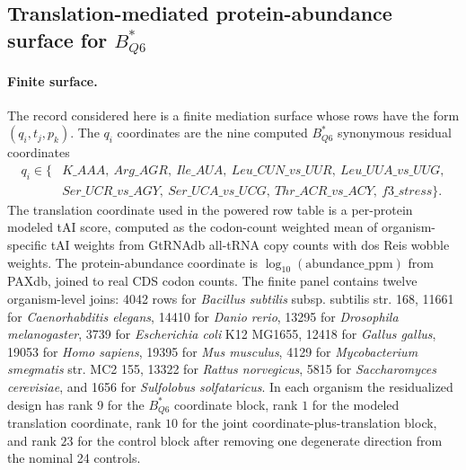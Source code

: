 \subsection{Translation-mediated protein-abundance surface for $B^{*}_{Q6}$}\label{sec:q6-translation-mediated-protein-abundance-cross-layer}

\paragraph{Finite surface.}
The record considered here is a finite mediation surface whose rows have the form $(q_i,t_j,p_k)$.  The $q_i$ coordinates are the nine computed $B^{*}_{Q6}$ synonymous residual coordinates
$$
\begin{aligned}
q_i \in \{&K\_AAA,\ Arg\_AGR,\ Ile\_AUA,\ Leu\_CUN\_vs\_UUR,\ Leu\_UUA\_vs\_UUG,\\
&Ser\_UCR\_vs\_AGY,\ Ser\_UCA\_vs\_UCG,\ Thr\_ACR\_vs\_ACY,\ f3\_stress\}.
\end{aligned}
$$
The translation coordinate used in the powered row table is a per-protein modeled tAI score, computed as the codon-count weighted mean of organism-specific tAI weights from GtRNAdb all-tRNA copy counts with dos Reis wobble weights.  The protein-abundance coordinate is $\log_{10}(\mathrm{abundance\_ppm})$ from PAXdb, joined to real CDS codon counts.  The finite panel contains twelve organism-level joins: 4042 rows for \emph{Bacillus subtilis} subsp. subtilis str. 168, 11661 for \emph{Caenorhabditis elegans}, 14410 for \emph{Danio rerio}, 13295 for \emph{Drosophila melanogaster}, 3739 for \emph{Escherichia coli} K12 MG1655, 12418 for \emph{Gallus gallus}, 19053 for \emph{Homo sapiens}, 19395 for \emph{Mus musculus}, 4129 for \emph{Mycobacterium smegmatis} str. MC2 155, 13322 for \emph{Rattus norvegicus}, 5815 for \emph{Saccharomyces cerevisiae}, and 1656 for \emph{Sulfolobus solfataricus}.  In each organism the residualized design has rank $9$ for the $B^{*}_{Q6}$ coordinate block, rank $1$ for the modeled translation coordinate, rank $10$ for the joint coordinate-plus-translation block, and rank $23$ for the control block after removing one degenerate direction from the nominal 24 controls.

